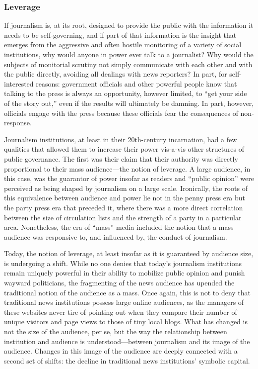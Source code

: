 \subsubsection{Leverage}

If journalism is, at its root, designed to provide the public with the information
it needs to be self-governing, and if part of that information is the insight that
emerges from the aggressive and often hostile monitoring of a variety of social
institutions, why would anyone in power ever talk to a journalist? Why would
the subjects of monitorial scrutiny not simply communicate with each other
and with the public directly, avoiding all dealings with news reporters? In part,
for self-interested reasons: government officials and other powerful people know
that talking to the press is always an opportunity, however limited, to ``get your
side of the story out,'' even if the results will ultimately be damning. In part, however,
officials engage with the press because these officials fear the consequences
of non-response.

Journalism institutions, at least in their 20th-century incarnation, had a few
qualities that allowed them to increase their power vis-a-vis other structures
of public governance. The first was their claim that their authority was directly
proportional to their mass audience—the notion of leverage. A large audience, in
this case, was the guarantor of power insofar as readers and ``public opinion'' were
perceived as being shaped by journalism on a large scale. Ironically, the roots of
this equivalence between audience and power lie not in the penny press era but
the party press era that preceded it, where there was a more direct correlation between the size of circulation lists and the strength of a party in a particular area.
Nonetheless, the era of ``mass'' media included the notion that a mass audience
was responsive to, and influenced by, the conduct of journalism.

Today, the notion of leverage, at least insofar as it is guaranteed by audience size,
is undergoing a shift. While no one denies that today’s journalism institutions
remain uniquely powerful in their ability to mobilize public opinion and punish
wayward politicians, the fragmenting of the news audience has upended the
traditional notion of the audience as a mass. Once again, this is not to deny that
traditional news institutions possess large online audiences, as the managers of
these websites never tire of pointing out when they compare their number of
unique visitors and page views to those of tiny local blogs. What has changed is
not the size of the audience, per se, but the way the relationship between institution
and audience is understood—between journalism and its image of the audience.
Changes in this image of the audience are deeply connected with a second
set of shifts: the decline in traditional news institutions’ symbolic capital.

